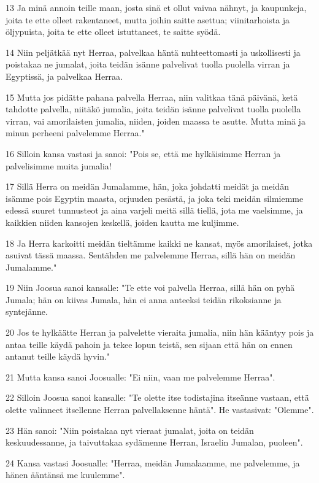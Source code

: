 \par 13 Ja minä annoin teille maan, josta sinä et ollut vaivaa nähnyt, ja kaupunkeja, joita te ette olleet rakentaneet, mutta joihin saitte asettua; viinitarhoista ja öljypuista, joita te ette olleet istuttaneet, te saitte syödä.
\par 14 Niin peljätkää nyt Herraa, palvelkaa häntä nuhteettomasti ja uskollisesti ja poistakaa ne jumalat, joita teidän isänne palvelivat tuolla puolella virran ja Egyptissä, ja palvelkaa Herraa.
\par 15 Mutta jos pidätte pahana palvella Herraa, niin valitkaa tänä päivänä, ketä tahdotte palvella, niitäkö jumalia, joita teidän isänne palvelivat tuolla puolella virran, vai amorilaisten jumalia, niiden, joiden maassa te asutte. Mutta minä ja minun perheeni palvelemme Herraa."
\par 16 Silloin kansa vastasi ja sanoi: "Pois se, että me hylkäisimme Herran ja palvelisimme muita jumalia!
\par 17 Sillä Herra on meidän Jumalamme, hän, joka johdatti meidät ja meidän isämme pois Egyptin maasta, orjuuden pesästä, ja joka teki meidän silmiemme edessä suuret tunnusteot ja aina varjeli meitä sillä tiellä, jota me vaelsimme, ja kaikkien niiden kansojen keskellä, joiden kautta me kuljimme.
\par 18 Ja Herra karkoitti meidän tieltämme kaikki ne kansat, myös amorilaiset, jotka asuivat tässä maassa. Sentähden me palvelemme Herraa, sillä hän on meidän Jumalamme."
\par 19 Niin Joosua sanoi kansalle: "Te ette voi palvella Herraa, sillä hän on pyhä Jumala; hän on kiivas Jumala, hän ei anna anteeksi teidän rikoksianne ja syntejänne.
\par 20 Jos te hylkäätte Herran ja palvelette vieraita jumalia, niin hän kääntyy pois ja antaa teille käydä pahoin ja tekee lopun teistä, sen sijaan että hän on ennen antanut teille käydä hyvin."
\par 21 Mutta kansa sanoi Joosualle: "Ei niin, vaan me palvelemme Herraa".
\par 22 Silloin Joosua sanoi kansalle: "Te olette itse todistajina itseänne vastaan, että olette valinneet itsellenne Herran palvellaksenne häntä". He vastasivat: "Olemme".
\par 23 Hän sanoi: "Niin poistakaa nyt vieraat jumalat, joita on teidän keskuudessanne, ja taivuttakaa sydämenne Herran, Israelin Jumalan, puoleen".
\par 24 Kansa vastasi Joosualle: "Herraa, meidän Jumalaamme, me palvelemme, ja hänen ääntänsä me kuulemme".
